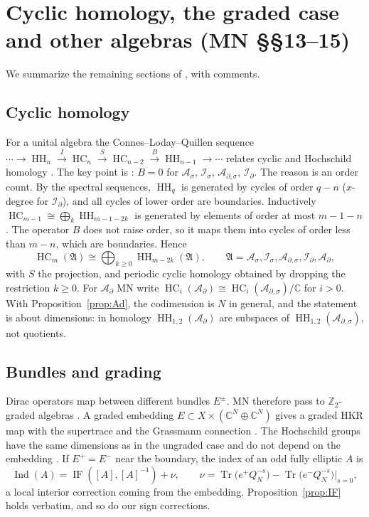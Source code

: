 \documentclass[11pt,oneside,reqno]{article}
\DeclareMathOperator{\HH}{HH}
\DeclareMathOperator{\HC}{HC}
\DeclareMathOperator{\Tr}{Tr}
\DeclareMathOperator{\Ind}{Ind}
\DeclareMathOperator{\IF}{IF}
\newcommand{\C}{\mathbb C}
\newcommand{\Is}{\mathcal I_\sigma}
\newcommand{\Id}{\mathcal I_\partial}
\newcommand{\As}{\mathcal A_\sigma}
\newcommand{\Ad}{\mathcal A_\partial}
\newcommand{\Ads}{\mathcal A_{\partial,\sigma}}
\theoremstyle{plain}
\theoremstyle{definition}
\theoremstyle{remark}
\begin{document}
\section{Cyclic homology, the graded case and other algebras (MN \S\S13--15)}
\label{sec:other}

We summarize the remaining sections of \cite{MN}, with comments.

\subsection{Cyclic homology}
For a unital algebra the Connes--Loday--Quillen sequence
\(\cdots\to\HH_n\xrightarrow{I}\HC_n\xrightarrow{S}\HC_{n-2}
\xrightarrow{B}\HH_{n-1}\to\cdots\) relates cyclic and Hochschild homology
\cite[(101)--(103)]{MN}. The key point is \cite[Lemma~17]{MN}: \(B=0\) for
\(\As\), \(\Is\), \(\Ads\), \(\Id\). The reason is an order count. By the
spectral sequences, \(\HH_q\) is generated by cycles of order \(q-n\)
(\(x\)-degree for \(\Id\)), and all cycles of lower order are
boundaries. Inductively \(\HC_{m-1}\cong\bigoplus_k\HH_{m-1-2k}\) is
generated by elements of order at most \(m-1-n\). The operator \(B\) does
not raise order, so it maps them into cycles of order less than \(m-n\),
which are boundaries. Hence \cite[Prop.~18]{MN}
\[
 \HC_m(\mathfrak A)\cong\bigoplus_{k\ge0}\HH_{m-2k}(\mathfrak A),\qquad
 \mathfrak A=\As,\Is,\Ads,\Id,\Ad ,
\]
with \(S\) the projection, and periodic cyclic homology obtained by
dropping the restriction \(k\ge0\). For \(\Ad\) MN write
\(\HC_i(\Ad)\cong\HC_i(\Ads)/\C\) for \(i>0\). With
Proposition~\ref{prop:Ad}, the codimension is \(N\) in general, and the
statement is about dimensions: in homology \(\HH_{1,2}(\Ad)\) are
subspaces of \(\HH_{1,2}(\Ads)\), not quotients.

\subsection{Bundles and grading}\label{subsec:graded}
Dirac operators map between different bundles \(E^\pm\). MN therefore
pass to \(\mathbb Z_2\)-graded algebras \cite[\S14]{MN}. A graded embedding
\(E\subset X\times(\C^N\oplus\C^N)\) gives a graded HKR map with the
supertrace and the Grassmann connection \cite[(105)]{MN}. The Hochschild
groups have the same dimensions as in the ungraded case and do not depend
on the embedding \cite[Lemma~18, Prop.~19]{MN}. If \(E^+=E^-\) near the
boundary, the index of an odd fully elliptic \(A\) is
\cite[Thm.~1, (111)]{MN}
\[
 \Ind(A)=\IF([A],[A]^{-1})+\nu,\qquad
 \nu=\Tr\bigl(e^+Q_N^{-s}\bigr)-\Tr\bigl(e^-Q_N^{-s}\bigr)\big|_{s=0},
\]
a local interior correction coming from the embedding. Proposition~\ref{prop:IF}
holds verbatim, and so do our sign corrections.
\end{document}

